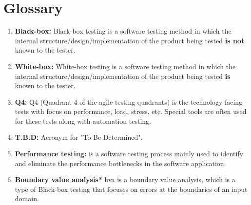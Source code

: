 \documentclass{article}
\begin{document}
\section*{Glossary} 

\begin{enumerate}
    \item \textbf{Black-box:} Black-box testing is a software testing method in which the internal structure/design/implementation of the product being tested \textbf{is not} known to the tester.
    \item \textbf{White-box:} White-box testing is a software testing method in which the internal structure/design/implementation of the product being tested \textbf{is} known to the tester.
    \item \textbf{Q4:} Q4 (Quadrant 4 of the agile testing quadrants) is the technology facing tests with focus on performance, load, stress, etc. Special tools are often used for these tests along with automation testing.
    \item \textbf{T.B.D:} Acronym for "To Be Determined". 
    \item \textbf{Performance testing:} is a software testing process mainly used to identify and eliminate the performance bottlenecks in the software application.
    \item \textbf{Boundary value analysis*} bva is a boundary value analysis, which is a type of Black-box testing that focuses on errors at the boundaries of an input domain.
\end{enumerate}

\newpage
\end{document}
